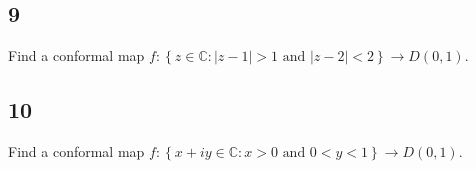 \documentclass[12pt]{article}
\begin{document}
\subsection*{9}
\begin{tcolorbox}
  Find a conformal map $f : \left\{ z \in \mathbb{C} : |z - 1| > 1 \text{ and } |z - 2| < 2 \right\} \rightarrow D(0,1)$.
\end{tcolorbox}


\subsection*{10}
\begin{tcolorbox}
  Find a conformal map $f : \left\{ x + iy \in \mathbb{C} : x > 0 \text{ and } 0 < y < 1 \right\} \rightarrow D(0,1)$.
\end{tcolorbox}
\end{document}
